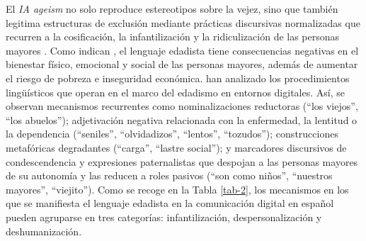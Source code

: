 \documentclass[spanish]{textolivre}
\begin{document}
El \textit{IA ageism} no solo reproduce estereotipos sobre la vejez, sino que también legitima estructuras de exclusión mediante prácticas discursivas normalizadas que recurren a la cosificación, la infantilización y la ridiculización de las personas mayores \cite{morenofernandez2025, vanleeuwen2024}. Como indican \textcite{sanchezizquierdo2023}, el lenguaje edadista tiene consecuencias negativas en el bienestar físico, emocional y social de las personas mayores, además de aumentar el riesgo de pobreza e inseguridad económica. \textcite{gomezcamacho2025} han analizado los procedimientos lingüísticos que operan en el marco del edadismo en entornos digitales. Así, se observan mecanismos recurrentes como nominalizaciones reductoras (``los viejos'', ``los abuelos''); adjetivación negativa relacionada con la enfermedad, la lentitud o la dependencia (``seniles'', ``olvidadizos'', ``lentos'', ``tozudos''); construcciones metafóricas degradantes (``carga'', ``lastre social''); y marcadores discursivos de condescendencia y expresiones paternalistas que despojan a las personas mayores de su autonomía y las reducen a roles pasivos (``son como niños'', ``nuestros mayores'', ``viejito''). Como se recoge en la Tabla \ref{tab-2}, los mecanismos en los que se manifiesta el lenguaje edadista en la comunicación digital en español pueden agruparse en tres categorías: infantilización, despersonalización y deshumanización.
\end{document}
